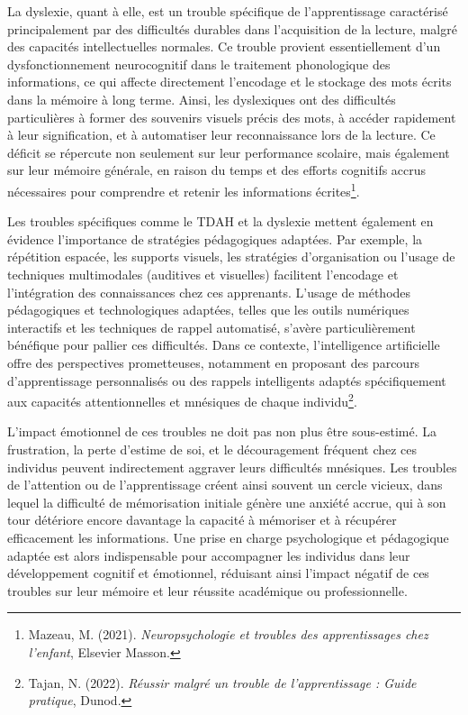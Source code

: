 \documentclass[11pt,a4paper]{report}
\begin{document}
La dyslexie, quant à elle, est un trouble spécifique de l’apprentissage caractérisé principalement par des difficultés durables dans l’acquisition de la lecture, malgré des capacités intellectuelles normales. Ce trouble provient essentiellement d’un dysfonctionnement neurocognitif dans le traitement phonologique des informations, ce qui affecte directement l’encodage et le stockage des mots écrits dans la mémoire à long terme. Ainsi, les dyslexiques ont des difficultés particulières à former des souvenirs visuels précis des mots, à accéder rapidement à leur signification, et à automatiser leur reconnaissance lors de la lecture. Ce déficit se répercute non seulement sur leur performance scolaire, mais également sur leur mémoire générale, en raison du temps et des efforts cognitifs accrus nécessaires pour comprendre et retenir les informations écrites\footnote{Mazeau, M. (2021). \textit{Neuropsychologie et troubles des apprentissages chez l'enfant}, Elsevier Masson.}.

Les troubles spécifiques comme le TDAH et la dyslexie mettent également en évidence l’importance de stratégies pédagogiques adaptées. Par exemple, la répétition espacée, les supports visuels, les stratégies d’organisation ou l’usage de techniques multimodales (auditives et visuelles) facilitent l’encodage et l’intégration des connaissances chez ces apprenants. L’usage de méthodes pédagogiques et technologiques adaptées, telles que les outils numériques interactifs et les techniques de rappel automatisé, s’avère particulièrement bénéfique pour pallier ces difficultés. Dans ce contexte, l'intelligence artificielle offre des perspectives prometteuses, notamment en proposant des parcours d'apprentissage personnalisés ou des rappels intelligents adaptés spécifiquement aux capacités attentionnelles et mnésiques de chaque individu\footnote{Tajan, N. (2022). \textit{Réussir malgré un trouble de l'apprentissage : Guide pratique}, Dunod.}.

L'impact émotionnel de ces troubles ne doit pas non plus être sous-estimé. La frustration, la perte d'estime de soi, et le découragement fréquent chez ces individus peuvent indirectement aggraver leurs difficultés mnésiques. Les troubles de l’attention ou de l’apprentissage créent ainsi souvent un cercle vicieux, dans lequel la difficulté de mémorisation initiale génère une anxiété accrue, qui à son tour détériore encore davantage la capacité à mémoriser et à récupérer efficacement les informations. Une prise en charge psychologique et pédagogique adaptée est alors indispensable pour accompagner les individus dans leur développement cognitif et émotionnel, réduisant ainsi l'impact négatif de ces troubles sur leur mémoire et leur réussite académique ou professionnelle.
\end{document}

